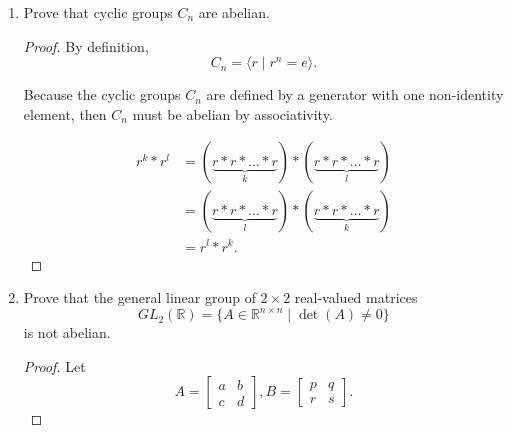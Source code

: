 \documentclass{article}
\begin{document}
\begin{enumerate}
{\begin{enumerate}
{                I do think so. We can likely apply some inductive proof to show that 
                adding a new \(g_k\) that is mutually commutative with all other 
                \(g_i\) does not impact the `abelian-ness' of the overall group 
                \(G\).
            }
        
            \item {
                Prove that cyclic groups \(C_n\) are abelian.
        
                \begin{proof}
                    By definition, 
                    \[C_n = \langle r \mid r^n = e \rangle.\]

                    Because the cyclic groups \(C_n\) are defined by a generator 
                    with one non-identity element, then \(C_n\) must be abelian
                    by associativity.

                    \begin{align}
                        r^k * r^l &= (\underbrace{r * r * \dots * r}_{k}) * (\underbrace{r * r * \dots * r}_{l} )\\
                                  &= (\underbrace{r * r * \dots * r}_{l}) * (\underbrace{r * r * \dots * r}_{k}) \\
                                  &= r^l * r^k.
                    \end{align}
                \end{proof}
            }

            \item {
                Prove that the general linear group of \(2 \times 2\) 
                real-valued matrices 
                \[GL_2(\mathbb{R}) = \{A \in \mathbb{R}^{n \times n} \mid \det(A) \neq 0\}\] 
                is not abelian.
        
                \begin{proof}
                    Let 
                    \[
                        A = 
                            \begin{bmatrix}
                                a & b \\
                                c & d 
                            \end{bmatrix},
                        B = 
                            \begin{bmatrix}
                                p & q \\
                                r & s
                            \end{bmatrix}.
                    \]


\end{proof}}
\end{enumerate}}
\end{enumerate}
\end{document}
